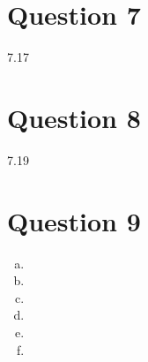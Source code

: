 \documentclass{article}
\begin{document}

\section*{Question 7}
7.17


\section*{Question 8}
7.19


\section*{Question 9}
\begin{enumerate}[(a)]
	\item 
	
	
	\item 
	
	
	\item 
	
	
	\item 
	
	
	\item 
	
	
	\item 
	
	
\end{enumerate}

\end{document}
